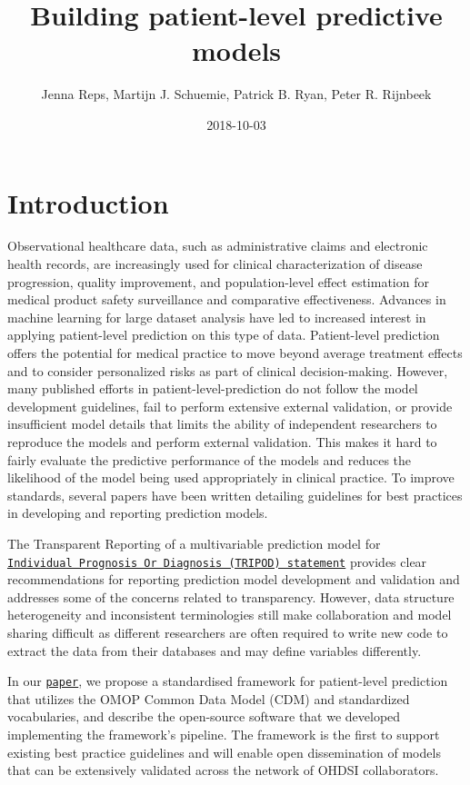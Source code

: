 \documentclass[]{article}
\title{Building patient-level predictive models}
\author{Jenna Reps, Martijn J. Schuemie, Patrick B. Ryan, Peter R. Rijnbeek}
\date{2018-10-03}
\begin{document}
\maketitle

{
\setcounter{tocdepth}{3}
\tableofcontents
}
\section{Introduction}\label{introduction}

Observational healthcare data, such as administrative claims and
electronic health records, are increasingly used for clinical
characterization of disease progression, quality improvement, and
population-level effect estimation for medical product safety
surveillance and comparative effectiveness. Advances in machine learning
for large dataset analysis have led to increased interest in applying
patient-level prediction on this type of data. Patient-level prediction
offers the potential for medical practice to move beyond average
treatment effects and to consider personalized risks as part of clinical
decision-making. However, many published efforts in
patient-level-prediction do not follow the model development guidelines,
fail to perform extensive external validation, or provide insufficient
model details that limits the ability of independent researchers to
reproduce the models and perform external validation. This makes it hard
to fairly evaluate the predictive performance of the models and reduces
the likelihood of the model being used appropriately in clinical
practice. To improve standards, several papers have been written
detailing guidelines for best practices in developing and reporting
prediction models.

The Transparent Reporting of a multivariable prediction model for
\href{https://www.equator-network.org/reporting-guidelines/tripod-statement/}{\texttt{Individual\ Prognosis\ Or\ Diagnosis\ (TRIPOD)\ statement}}
provides clear recommendations for reporting prediction model
development and validation and addresses some of the concerns related to
transparency. However, data structure heterogeneity and inconsistent
terminologies still make collaboration and model sharing difficult as
different researchers are often required to write new code to extract
the data from their databases and may define variables differently.

In our
\href{https://academic.oup.com/jamia/article/25/8/969/4989437}{\texttt{paper}},
we propose a standardised framework for patient-level prediction that
utilizes the OMOP Common Data Model (CDM) and standardized vocabularies,
and describe the open-source software that we developed implementing the
framework's pipeline. The framework is the first to support existing
best practice guidelines and will enable open dissemination of models
that can be extensively validated across the network of OHDSI
collaborators.
\end{document}
